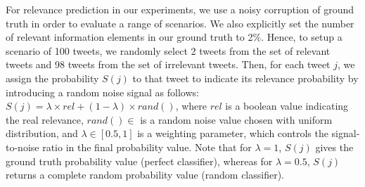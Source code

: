 


For relevance prediction in our experiments, we use a noisy corruption of ground truth in order to evaluate a range of scenarios. %
We also explicitly set the number of relevant information elements in our ground truth to 2\%.  Hence, to setup a scenario of 100 tweets, we randomly select 2 tweets from the set of relevant tweets and 98 tweets from the set of irrelevant tweets.  Then, for each tweet $j$, we assign the probability $S(j)$ to that tweet to indicate its relevance probability by introducing a random noise signal as follows: $S(j) = \lambda\times rel+(1-\lambda)\times rand()$, 
 where $rel$ is a boolean value indicating the real relevance, $rand()\in $ is a random noise value chosen with uniform distribution, and $\lambda\in [0.5,1]$ is a weighting parameter, which controls the signal-to-noise ratio in the final probability value. Note that for $\lambda=1$, $S(j)$ gives the ground truth probability value (perfect classifier), whereas for $\lambda=0.5$, $S(j)$ returns a complete random probability value (random classifier).


